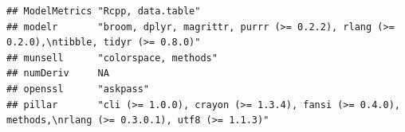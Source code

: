 \documentclass[]{article}
\begin{document}
\begin{verbatim}
## ModelMetrics "Rcpp, data.table"                                                                                                                                                                                                                                                                                                                                                                                                                                                                    
## modelr       "broom, dplyr, magrittr, purrr (>= 0.2.2), rlang (>= 0.2.0),\ntibble, tidyr (>= 0.8.0)"                                                                                                                                                                                                                                                                                                                                                                                               
## munsell      "colorspace, methods"                                                                                                                                                                                                                                                                                                                                                                                                                                                                 
## numDeriv     NA                                                                                                                                                                                                                                                                                                                                                                                                                                                                                    
## openssl      "askpass"                                                                                                                                                                                                                                                                                                                                                                                                                                                                             
## pillar       "cli (>= 1.0.0), crayon (>= 1.3.4), fansi (>= 0.4.0), methods,\nrlang (>= 0.3.0.1), utf8 (>= 1.1.3)"                                                                                                                                                                                                                                                                                                                                                                                  

\end{verbatim}
\end{document}
